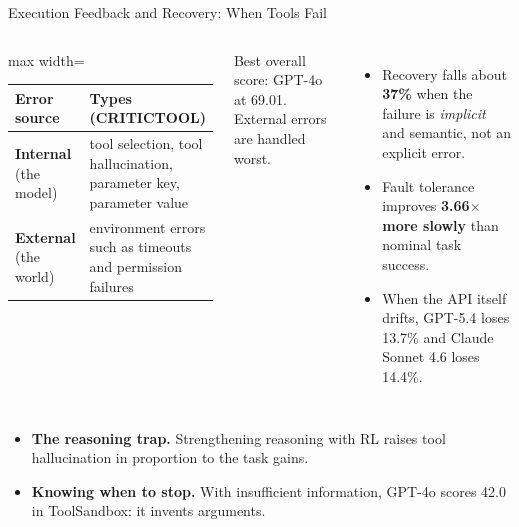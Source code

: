\begin{frame}{Execution Feedback and Recovery: When Tools Fail}
    \begin{columns}[T,onlytextwidth]
        \centering
        \small
        \renewcommand{\arraystretch}{1.25}
        \begin{adjustbox}{max width=\linewidth}\begin{tabular}{>{\raggedright\arraybackslash}p{1.9cm}>{\raggedright\arraybackslash}p{4.3cm}}
            \toprule
            \textbf{Error source} & \textbf{Types (CRITICTOOL)} \\
            \midrule
            \textbf{Internal} (the model) & tool selection, tool hallucination, parameter key, parameter value \\
            \textbf{External} (the world) & environment errors such as timeouts and permission failures \\
            \bottomrule
        \end{tabular}\end{adjustbox}

        \vspace{0.4em}
        {\footnotesize Best overall score: GPT-4o at 69.01. External errors are handled worst.}
        \begin{itemize}\itemsep0.4em
            \item Recovery falls about \textbf{37\%} when the failure is \emph{implicit} and semantic, not an explicit error.
            \item Fault tolerance improves \textbf{3.66$\times$ more slowly} than nominal task success.
            \item When the API itself drifts, GPT-5.4 loses 13.7\% and Claude Sonnet 4.6 loses 14.4\%.
        \end{itemize}
    \end{columns}
    \vspace{0.5em}
    \begin{itemize}\itemsep0.4em
        \item \textbf{The reasoning trap.} Strengthening reasoning with RL \alert{raises} tool hallucination in proportion to the task gains.
        \item \textbf{Knowing when to stop.} With insufficient information, GPT-4o scores 42.0 in ToolSandbox: it invents arguments.
    \end{itemize}
\end{frame}

